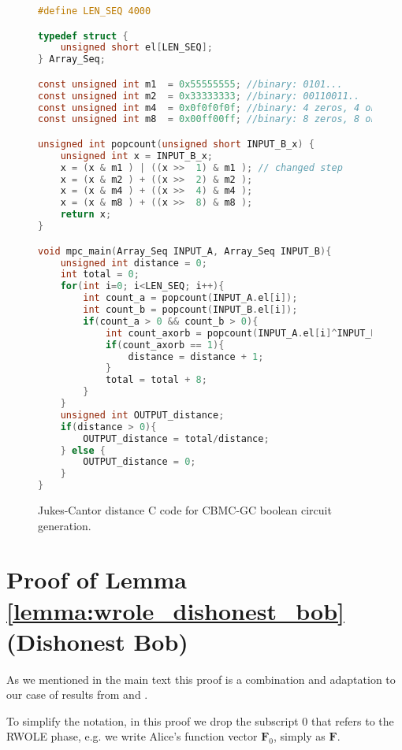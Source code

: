 \begin{figure}
\begin{lstlisting}[language=C]
#define LEN_SEQ 4000

typedef struct {
	unsigned short el[LEN_SEQ];
} Array_Seq;

const unsigned int m1  = 0x55555555; //binary: 0101...
const unsigned int m2  = 0x33333333; //binary: 00110011..
const unsigned int m4  = 0x0f0f0f0f; //binary: 4 zeros, 4 ones ...
const unsigned int m8  = 0x00ff00ff; //binary: 8 zeros, 8 ones ...

unsigned int popcount(unsigned short INPUT_B_x) {
    unsigned int x = INPUT_B_x;
    x = (x & m1 ) | ((x >>  1) & m1 ); // changed step
    x = (x & m2 ) + ((x >>  2) & m2 );
    x = (x & m4 ) + ((x >>  4) & m4 ); 
    x = (x & m8 ) + ((x >>  8) & m8 );
    return x;
}

void mpc_main(Array_Seq INPUT_A, Array_Seq INPUT_B){
	unsigned int distance = 0;
	int total = 0;
	for(int i=0; i<LEN_SEQ; i++){		
		int count_a = popcount(INPUT_A.el[i]);
		int count_b = popcount(INPUT_B.el[i]);
		if(count_a > 0 && count_b > 0){
			int count_axorb = popcount(INPUT_A.el[i]^INPUT_B.el[i]);			
			if(count_axorb == 1){
				distance = distance + 1;
			}
			total = total + 8;
		}
	}
	unsigned int OUTPUT_distance;
	if(distance > 0){
		OUTPUT_distance = total/distance;
	} else {
		OUTPUT_distance = 0;
	}
}
\end{lstlisting}
\caption{Jukes-Cantor distance C code for CBMC-GC boolean circuit generation.}
\label{fig:jc_cbmc-gc}
\end{figure}
 

\chapter{Proof of Lemma \ref{lemma:wrole_dishonest_bob} (Dishonest Bob)}
\label{app:proofBobdishonest}

As we mentioned in the main text this proof is  a combination and adaptation to our case of results from \cite{DFLSS09} and \cite{Dupuis2015}. 

To simplify the notation, in this proof we drop the subscript $0$ that refers to the RWOLE phase, e.g. we write Alice's function vector  $\mathbf{F}_0$,  simply  as $\mathbf{F}$. 


